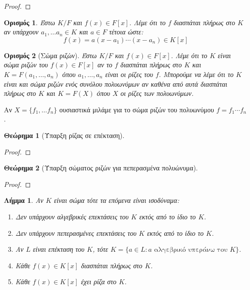 \documentclass[oneside,a4paper]{article}
\newtheorem{theorem}{Θεώρημα}
\newtheorem{lemma}{Λήμμα}
\newtheorem*{defn}{Ορισμός}
\begin{document}
\begin{proof}
\end{proof}

\begin{defn} Έστω $K/F$ και $f(x) \in F[x]$. Λέμε ότι το $f$ διασπάται πλήρως στο $K$ αν υπάρχουν $a_1 , \ldots a_n \in K$ και $a \in F$ τέτοια ώστε:
	$$f(x) = a (x-a_1)\cdots (x-a_n) \in K[x]$$
\end{defn}

\begin{defn}[Σώμα ριζών]
	Έστω $K/F$ και $f(x) \in F[x]$. Λέμε ότι το $K$ είναι σώμα ριζών του $f(x) \in F[x]$ αν το $f$ διασπάται πλήρως στο $K$ και $K=F(a_1 , \ldots, a_n)$ όπου $a_1 ,\ldots ,a_n$ είναι οι ρίζες του $f$. Μπορούμε να λέμε ότι το $K$ είναι και σώμα ριζών ενός συνόλου πολυωνύμων αν καθένα από αυτά διασπάται πλήρως στο $K$ και $K=F(X)$ όπου $X$ οι ρίζες των πολυωνύμων.
\end{defn}

Aν $X = \{f_1 , \ldots f_n\}$ ουσιαστικά μιλάμε για το σώμα ριζών του πολυωνύμου $f = f_1 \cdots f_n$.

\begin{theorem} [Ύπαρξη ρίζας σε επέκταση]
\end{theorem}

\begin{proof}
\end{proof}

\begin{theorem}[Ύπαρξη σώματος ριζών για πεπερασμένα πολυώνυμα]
\end{theorem}

\begin{proof}
\end{proof}

\begin{lemma} 
	\label{tria deka}
	Αν $K$ είναι σώμα τότε τα επόμενα είναι ισοδύναμα:
	\begin{enumerate}
		\item Δεν υπάρχουν αλγεβρικές επεκτάσεις του $K$ εκτός από το ίδιο το $K$.
		\item Δεν υπάρχουν πεπερασμένες επεκτάσεις του $K$ εκτός από το ίδιο το $K$.
		\item Αν $L$ είναι επέκταση του $K$, τότε $K = \{a \in L: a \text{ αλγεβρικό υπεράνω του } K \}$.
		\item Κάθε $f(x) \in K[x]$ διασπάται πλήρως στο $K$.
		\item Κάθε $f(x) \in K[x]$ έχει ρίζα στο $K$. 
	\end{enumerate}
\end{lemma}
\end{document}
